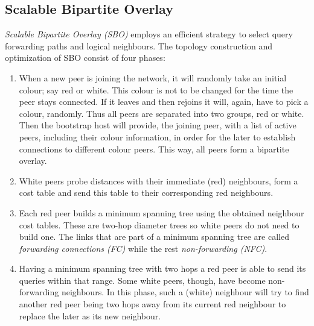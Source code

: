 \documentclass[a4paper,10pt]{article}
\begin{document}
\subsection{Scalable Bipartite Overlay}
\emph{Scalable Bipartite Overlay (SBO)} \cite{liu_bipartite_2007} employs an efficient strategy to select query forwarding paths and logical neighbours. The topology construction and optimization of SBO consist of four phases:
\begin{enumerate}
  \item When a new peer is joining the network, it will randomly take an initial colour; say red or white. This colour is not to be changed for the time the peer stays connected. If it leaves and then rejoins it will, again, have to pick a colour, randomly. Thus all peers are separated into two groups, red or white. Then the bootstrap host will provide, the joining peer, with a list of active peers, including their colour information, in order for the later to establish connections to different colour peers. This way, all peers form a bipartite overlay.
  \item White peers probe distances with their immediate (red) neighbours, form a cost table and send this table to their corresponding red neighbours.
  \item Each red peer builds a minimum spanning tree using the obtained neighbour cost tables. These are two-hop diameter trees so white peers do not need to build one. The links that are part of a minimum spanning tree are called \emph{forwarding connections (FC)} while the rest \emph{non-forwarding (NFC)}.
  \item Having a minimum spanning tree with two hops a red peer is able to send its queries within that range. Some white peers, though, have become non-forwarding neighbours. In this phase, such a (white) neighbour will try to find another red peer being two hops away from its current red neighbour to replace the later as its new neighbour.
\end{enumerate}
\end{document}
